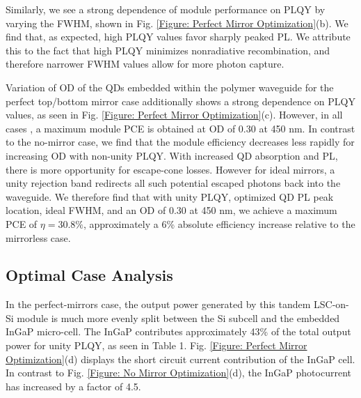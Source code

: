 \documentclass[conference]{./pvsctran}
\begin{document}
		Similarly, we see a strong dependence of module performance on PLQY by varying the FWHM, shown in Fig. \ref{Figure: Perfect Mirror Optimization}(b). We find that, as expected, high PLQY values favor sharply peaked PL. We attribute this to the fact that high PLQY minimizes nonradiative recombination, and therefore narrower FWHM values allow for more photon capture.
		
		Variation of OD of the QDs embedded within the polymer waveguide for the perfect top/bottom mirror case additionally shows a strong dependence on PLQY values, as seen in Fig. \ref{Figure: Perfect Mirror Optimization}(c). However, in all cases , a maximum module PCE is obtained at OD of 0.30 at 450 nm. In contrast to the no-mirror case, we find that the module efficiency decreases less rapidly for increasing OD with non-unity PLQY. With increased QD absorption and PL, there is more opportunity for escape-cone losses. However for ideal mirrors, a unity rejection band redirects all such potential escaped photons back into the waveguide. We therefore find that with unity PLQY, optimized QD PL peak location, ideal FWHM, and an OD of 0.30 at 450 nm, we achieve a maximum PCE of $\eta = 30.8\%$, approximately a 6\% absolute efficiency increase relative to the mirrorless case. 
		
		\subsection*{Optimal Case Analysis}
		
		In the perfect-mirrors case, the output power generated by this tandem LSC-on-Si module is much more evenly split between the Si subcell and the embedded InGaP micro-cell. The InGaP contributes approximately 43\% of the total output power for unity PLQY, as seen in Table 1. Fig. \ref{Figure: Perfect Mirror Optimization}(d) displays the short circuit current contribution of the InGaP cell. In contrast to Fig. \ref{Figure: No Mirror Optimization}(d), the InGaP photocurrent has increased by a factor of 4.5.
		
\end{document}
